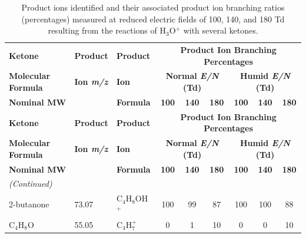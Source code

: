 
{\small

\begin{longtable}[c]{lllcccccc}
\caption{Product ions identified and their associated product ion branching ratios (percentages) measured at reduced electric fields of 100, 140, and 180 Td resulting
from the reactions of H$_{3}$O$^+$ with several ketones.}
\label{table:ketones}\\
\hline\textbf{Ketone} & \textbf{Product} & \textbf{Product} & \multicolumn{6}{c}{\textbf{Product Ion Branching Percentages}} \\ \cline{4-9}
\textbf{Molecular Formula} & \textbf{Ion \textit{m/z}} & \textbf{Ion} & \multicolumn{3}{c}{\textbf{Normal \textit{E/N} (Td)}} & \multicolumn{3}{c}{\textbf{Humid \textit{E/N} (Td)}} \\ \cline{4-6} \cline{7-9}
\textbf{Nominal MW} & \textbf{} & \textbf{Formula} & \textbf{100} & \textbf{140} & \textbf{180} & \textbf{100} & \textbf{140} & \textbf{180} \\\hline
\endfirsthead
\hline\textbf{Ketone} & \textbf{Product} & \textbf{Product} & \multicolumn{6}{c}{\textbf{Product Ion Branching Percentages}} \\ \cline{4-9}
\textbf{Molecular Formula} & \textbf{Ion \textit{m/z}} & \textbf{Ion} & \multicolumn{3}{c}{\textbf{Normal \textit{E/N} (Td)}} & \multicolumn{3}{c}{\textbf{Humid \textit{E/N} (Td)}} \\ \cline{4-6} \cline{7-9}
\textbf{Nominal MW} & \textbf{} & \textbf{Formula} & \textbf{100} & \textbf{140} & \textbf{180} & \textbf{100} & \textbf{140} & \textbf{180} \\\hline
\endhead
\textit{(Continued)}
\endfoot
%
\endlastfoot
\multicolumn{9}{c}{Linear ketones} \\ \hline
2-butanone & 73.07 & C$_4$H$_{8}$OH$^+$ & 100 & 99 & 87 & 100 & 100 & 88 \\
C$_4$H$_{8}$O & 55.05 & C$_4$H$_{7}^+$ & 0 & 1 & 10 & 0 & 0 & 10 \\

\end{longtable}}
